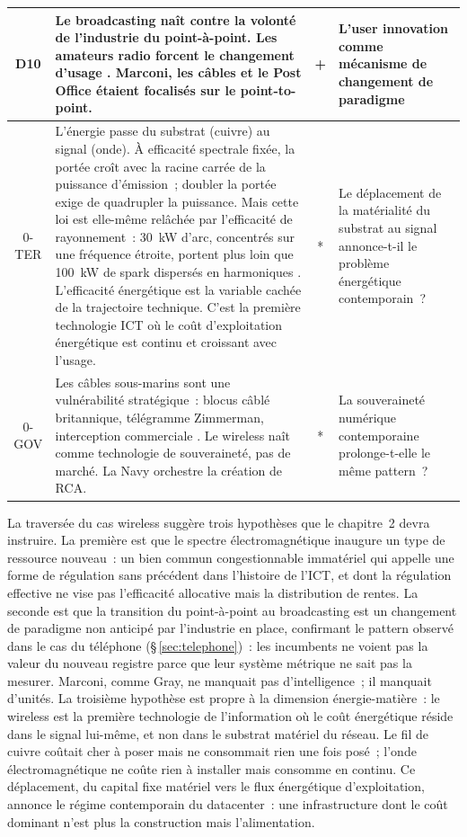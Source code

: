 \begin{table}[p]
\begin{tabularx}{\textwidth}{@{}cXcp{4.5cm}@{}}
D10 & Le broadcasting naît contre la volonté de l'industrie du point-à-point. Les amateurs radio forcent le changement d'usage \parencite{douglas_inventing_1987}. Marconi, les câbles et le Post Office étaient focalisés sur le point-to-point. & + & L'user innovation comme mécanisme de changement de paradigme \\[3pt]
\midrule
0-TER & L'énergie passe du substrat (cuivre) au signal (onde). À efficacité spectrale fixée, la portée croît avec la racine carrée de la puissance d'émission~; doubler la portée exige de quadrupler la puissance. Mais cette loi est elle-même relâchée par l'efficacité de rayonnement~: 30~kW d'arc, concentrés sur une fréquence étroite, portent plus loin que 100~kW de spark dispersés en harmoniques \parencite{aitken_continuous_1985}. L'efficacité énergétique est la variable cachée de la trajectoire technique. C'est la première technologie ICT où le coût d'exploitation énergétique est continu et croissant avec l'usage. & * & Le déplacement de la matérialité du substrat au signal annonce-t-il le problème énergétique contemporain~? \\[3pt]
0-GOV & Les câbles sous-marins sont une vulnérabilité stratégique~: blocus câblé britannique, télégramme Zimmerman, interception commerciale \parencite{aitken_continuous_1985}. Le wireless naît comme technologie de souveraineté, pas de marché. La Navy orchestre la création de RCA. & * & La souveraineté numérique contemporaine prolonge-t-elle le même pattern~? \\[3pt]
\bottomrule
\end{tabularx}
\renewcommand{\arraystretch}{1.0}
\end{table}

La traversée du cas wireless suggère trois hypothèses que le chapitre~2 devra instruire. La première est que le spectre électromagnétique inaugure un type de ressource nouveau~: un bien commun congestionnable immatériel qui appelle une forme de régulation sans précédent dans l'histoire de l'ICT, et dont la régulation effective ne vise pas l'efficacité allocative mais la distribution de rentes. La seconde est que la transition du point-à-point au broadcasting est un changement de paradigme non anticipé par l'industrie en place, confirmant le pattern observé dans le cas du téléphone (§\,\ref{sec:telephone})~: les incumbents ne voient pas la valeur du nouveau registre parce que leur système métrique ne sait pas la mesurer. Marconi, comme Gray, ne manquait pas d'intelligence~; il manquait d'unités. La troisième hypothèse est propre à la dimension énergie-matière~: le wireless est la première technologie de l'information où le coût énergétique réside dans le signal lui-même, et non dans le substrat matériel du réseau. Le fil de cuivre coûtait cher à poser mais ne consommait rien une fois posé~; l'onde électromagnétique ne coûte rien à installer mais consomme en continu. Ce déplacement, du capital fixe matériel vers le flux énergétique d'exploitation, annonce le régime contemporain du datacenter~: une infrastructure dont le coût dominant n'est plus la construction mais l'alimentation.

